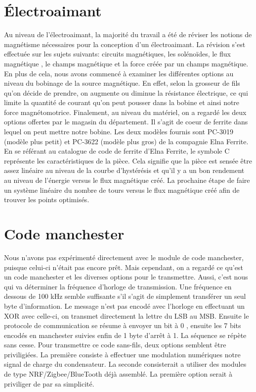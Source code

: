 \section{Électroaimant}
Au niveau de l'électroaimant, la majorité du travail a été  de réviser les notions de magnétisme nécessaires pour la conception d'un électroaimant. La révision s'est effectuée sur
les sujets suivants: circuits magnétiques, les solénoïdes, le flux magnétique , le champs magnétique et la force créée par un champs magnétique. En plus de cela, nous avons commencé à examiner
les différentes options au niveau du bobinage de la source magnétique. En effet, selon la grosseur de fils qu'on décide de prendre, on augmente ou diminue la résistance électrique, ce qui
limite la quantité de courant qu'on peut pousser dans la bobine et ainsi notre force magnétomotrice. Finalement, au niveau du matériel, on a regardé les deux options offertes par le magasin du département.
Il s'agit de coeur de ferrite dans lequel on peut mettre notre bobine. Les deux modèles fournis sont PC-3019 (modèle plus petit) et PC-3622 (modèle plus gros) de la compagnie Elna Ferrite. En se référant
au catalogue de code de ferrite d'Elna Ferrite, le symbole C représente les caractéristiques de la pièce. Cela signifie que la pièce est sensée être assez linéaire au niveau de la courbe d'hystérésis et
qu'il y a un bon rendement au niveau de l'énergie versus le flux magnétique créé. La prochaine étape de faire un système linéaire du nombre de tours versus le flux magnétique créé afin de trouver
les points optimisés.

\section{Code manchester}
Nous n'avons pas expérimenté directement avec le module de code manchester, puisque celui-ci n'était pas encore prêt. Mais cependant, on a regardé ce qu'est un code manchester
et les diverses options pour le transmettre. Aussi, c'est nous qui va déterminer la fréquence d'horloge de transmission. Une fréquence en dessous de 100 kHz semble suffisante s'il s'agit de simplement
transférer un seul byte d'information. Le message n'est pas encodé avec l'horloge en effectuant un XOR avec celle-ci, on transmet directement la lettre du LSB au MSB. Ensuite le protocole de communication
se résume à envoyer un bit à 0 , ensuite les 7 bits encodés en manchester suivies enfin de 1 byte d'arrêt à 1. La séquence se répète sans cesse. Pour transmettre ce code sans-fils, deux options semblent
être priviligiées. La première consiste à effectuer une modulation numériques notre signal de charge du condensateur. La seconde consisterait a utiliser des modules de type NRF/Zigbee/BlueTooth déjà
assemblé. La première option serait à priviliger de par sa simplicité.
